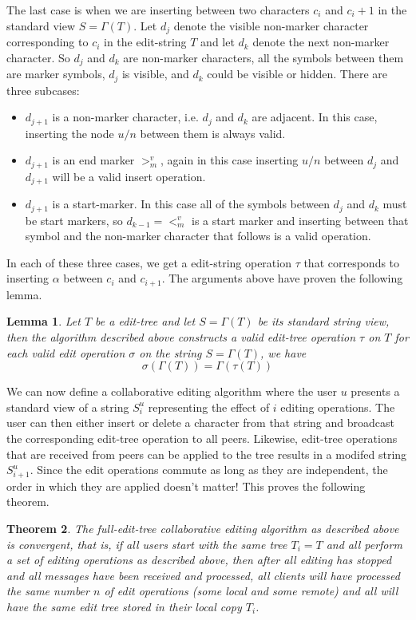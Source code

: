 \documentclass{amsart}
\newtheorem{theorem}{Theorem}[section]
\newtheorem{lemma}[theorem]{Lemma}
\begin{document}
The last case is when we are inserting between two characters $c_i$ and $c{_i+1}$
in the standard view $S = \Gamma(T)$. Let $d_j$ denote the visible non-marker
character corresponding to $c_i$ in the edit-string $T$ and let
$d_k$ denote the next non-marker character. So $d_j$ and $d_k$ are non-marker
characters, all the symbols between them are marker symbols, $d_j$ is
visible, and $d_k$ could be visible or hidden. There are three subcases:
\begin{itemize} 
\item $d_{j+1}$ is a non-marker character, i.e. $d_j$ and $d_k$ are adjacent. 
In this case, inserting
the node $u/n$ between them is always valid.
\item $d_{j+1}$ is an end marker $>^v_m$, again in this case inserting $u/n$
between $d_j$ and $d_{j+1}$ will be a valid insert operation.
\item $d_{j+1}$ is a start-marker. In this case all of the symbols between
$d_j$ and $d_k$ must be start markers, so $d_{k-1} = <^v_m$ is a start marker
and inserting between that symbol and the non-marker character that follows
is a valid operation.
\end{itemize}
In each of these three cases, we get a edit-string operation $\tau$ that
corresponds to inserting $\alpha$ between $c_i$ and $c_{i+1}$. The arguments
above have proven the following lemma.


\begin{lemma}
Let $T$ be a edit-tree and let $S=\Gamma(T)$ be its standard string view, then
the algorithm described above constructs a valid edit-tree operation $\tau$
on $T$ for each valid edit operation $\sigma$ on the string $S=\Gamma(T)$,
we have
\[
\sigma(\Gamma(T)) = \Gamma(\tau(T))
\]
\end{lemma}


We can now define a
collaborative editing algorithm where the user $u$ presents 
a standard view of a
string $S^u_i$ representing the effect of $i$ editing operations.
The user can then either insert or delete a character from that string
and broadcast the corresponding edit-tree operation to all peers.
Likewise, edit-tree operations that are received from peers can be applied to
the tree results in a modifed string $S^u_{i+1}$. Since the edit operations commute as long as they are independent, the order in which they are applied doesn't matter!
This proves the following theorem.

\begin{theorem}
The full-edit-tree collaborative editing algorithm as described above
is convergent, that is, if all users start with the same tree $T_i=T$ and
all perform a set of editing operations as described above, then after all
editing has stopped and all messages have been received and processed, all clients
will have processed the same number $n$ of edit operations (some local and
some remote) and all will have the same edit tree stored in their local copy
$T_i$.
\end{theorem}
\end{document}
